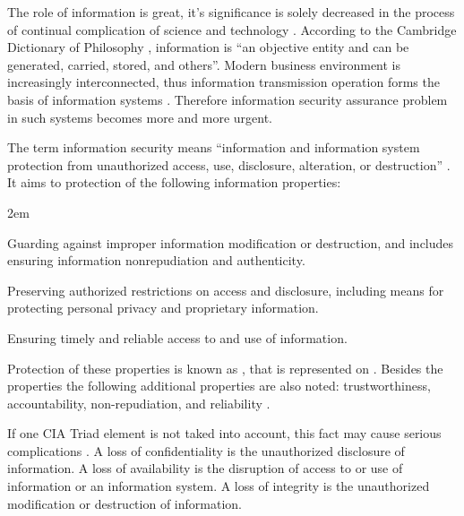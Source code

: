 %
The role of information is great, it's significance is solely decreased in the process of continual complication of science and technology . 
%
According to the Cambridge Dictionary of Philosophy , information is ``an objective entity and can be generated, carried, stored, and others''. 
%
Modern business environment is increasingly interconnected, thus information transmission operation forms the basis of information systems . 
%
Therefore information security assurance problem in such systems becomes more and more urgent. 

%
The term information security means ``information and information system protection from unauthorized access, use, disclosure, alteration, or destruction'' . 
%
It aims to protection of the following information properties:
\begin{description}
	\leftskip2em%
	\setlength{\itemsep}{0pt}%
	\setlength{\parsep}{0pt}%

	\item[Integrity] Guarding against improper information modification or destruction, and includes ensuring information nonrepudiation and authenticity. 
	\item[Confidentiality] Preserving authorized restrictions on access and disclosure, including means for protecting personal privacy and proprietary information. 
	\item[Availability] Ensuring timely and reliable access to and use of information. 
\end{description}

%
Protection of these properties is known as , that is represented on . 
%
Besides the properties the following additional properties are also noted: trustworthiness, accountability, non-repudiation, and reliability . 


%
If one CIA Triad element is not taked into account, this fact may cause serious complications . 
%
A loss of confidentiality is the unauthorized disclosure of information. 
%
A loss of availability is the disruption of access to or use of information or an information system. 
%
A loss of integrity is the unauthorized modification or destruction of information. 

